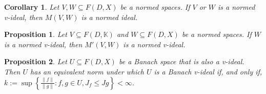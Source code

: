 \documentclass[14pt, a4paper]{article}  %
\providecommand{\llave}[1]{\left\lbrace #1\right\rbrace }
\providecommand{\pare}[1]{\left( #1\right) }
\newcommand{\K}{\mathbb{K}}
\newtheorem{corollary}{Corollary}[section]
\newtheorem{proposition}{Proposition}[section]
\begin{document}
 \begin{corollary}\label{final6}
 	Let $V,W\subseteq F\pare{D,X}$ be a normed spaces.  If    $V$ or $W$ is a normed v-ideal, then  $M\pare{V,W}$ is a normed ideal.  
 \end{corollary}   
 
 \begin{proposition}   Let $V \subseteq F\pare{D, \K}$ and $W \subseteq F\pare{D, X}$ be a normed spaces. If  $W$ is a normed v-ideal, then  $M'\pare{V,W}$ is a normed v-ideal. 
 \end{proposition}
 
 \begin{proposition}\label{final7}
 	Let $U \subseteq F(D,X)$ be a Banach space that is also a v-ideal. Then $U$ has an equivalent norm under which $U$ is a Banach v-ideal if, and only if,
 	$k:=\sup \llave{ \frac{ \|f\|}{\|g\|}:   f, g  \in U, J_f \leq Jg } < \infty$.
 \end{proposition}
\end{document}
